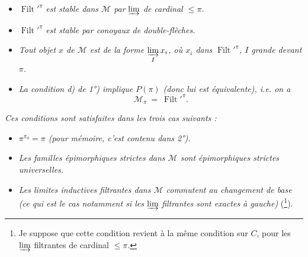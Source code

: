 \documentclass[11pt]{article}
\newcommand{\printedpage}[1]{\marginpar{\footnotesize p.~#1}}
\newcommand{\msp}[1]{\marginpar{\footnotesize [#1]}}
\newcommand{\Filt}{\operatorname{Filt}}
\begin{document}
\setcounter{footnote}{49}

\printedpage{39}

\begin{itemize}
\item[\textit{1)}] $\Filt'^{\pi}$ \textit{est stable dans $\mathcal{M}$ par} $\varinjlim$ \textit{de cardinal $\leqslant \pi$.}
\item[\textit{1$'$)}] $\Filt'^{\pi}$ \textit{est stable par conoyaux de double-flèches.}
\item[\textit{2)}] \textit{Tout objet $x$ de $\mathcal{M}$ est de la forme $\varinjlim\limits_{I} x_i$, où $x_i$ dans} $\Filt'^{\pi}$\textit{, $I$ grande devant $\pi$.}
\item[\textit{3)}] \textit{La condition d) de 1°) implique $P(\pi)$ (donc lui est équivalente), i.e. on a}
\[ \mathcal{M}_{\pi} \ = \ \Filt'^{\pi}. \]
\end{itemize}

\msp{page 127}
\textit{Ces conditions sont satisfaites dans les trois cas suivants :}
\begin{itemize}
\item[\textit{A)}] \textit{$\pi^{\pi_0} = \pi$ (pour mémoire, c'est contenu dans 2°).}
\item[\textit{B)}] \textit{Les familles épimorphiques strictes dans $\mathcal{M}$ sont épimorphiques strictes universelles.}
\item[\textit{C)}] \textit{Les limites inductives filtrantes dans $\mathcal{M}$ commutent au changement de base (ce qui est le cas notamment si les} $\varinjlim$ \textit{filtrantes sont exactes à gauche)} (\footnote{Je suppose que cette condition revient à la même condition sur $C$, pour les $\varinjlim$ filtrantes de cardinal $\leqslant \pi$.}).
\end{itemize}
\end{document}
